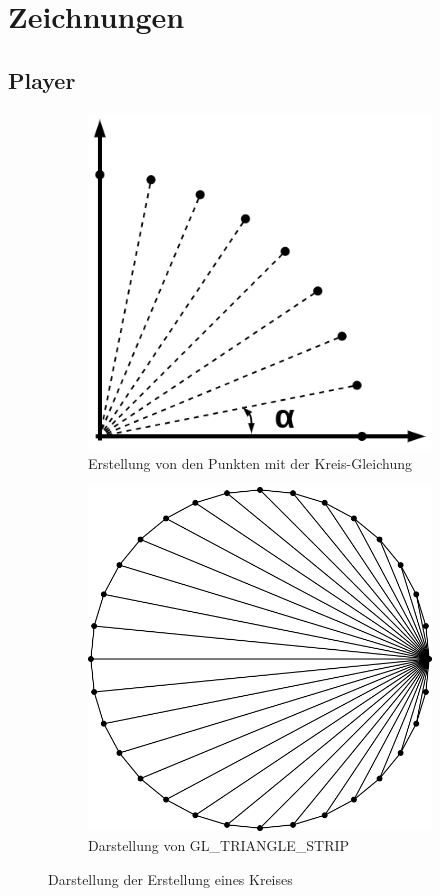 \documentclass[doktyp=studarbeit]{TUBAFarbeiten}
\begin{document}
\section{Zeichnungen}

\subsection{Player}

\begin{figure}[!htb]
    \centering
    \begin{subfigure}[b]{0.4\textwidth}
        \centering
        \includegraphics[width=0.8\linewidth]{kreis-1.png}
        \caption{Erstellung von den Punkten mit der Kreis-Gleichung}
    \end{subfigure}
    \begin{subfigure}[b]{0.4\textwidth}
        \centering
        \includegraphics[width=0.8\linewidth]{kreis-2.png}
        \caption{Darstellung von GL\_TRIANGLE\_STRIP}
    \end{subfigure}
    \caption{Darstellung der Erstellung eines Kreises}
    \label{fig:player}
\end{figure}
\end{document}
